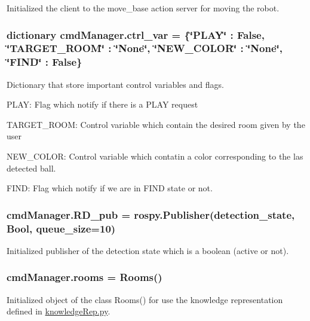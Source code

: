 Initialized the client to the move\+\_\+base action server for moving the robot. 

\subsubsection[{\texorpdfstring{ctrl\+\_\+var}{ctrl_var}}]{\setlength{\rightskip}{0pt plus 5cm}dictionary cmd\+Manager.\+ctrl\+\_\+var = \{\char`\"{}P\+L\+AY\char`\"{} \+: False, \char`\"{}T\+A\+R\+G\+E\+T\+\_\+\+R\+O\+OM\char`\"{} \+: \char`\"{}None\char`\"{}, \char`\"{}N\+E\+W\+\_\+\+C\+O\+L\+OR\char`\"{} \+: \char`\"{}None\char`\"{}, \char`\"{}F\+I\+ND\char`\"{} \+: False\}}\hypertarget{namespacecmdManager_a927e4211865b745599afe42e9e8d7c8e}{}\label{namespacecmdManager_a927e4211865b745599afe42e9e8d7c8e}


Dictionary that store important control variables and flags. 


\begin{DoxyItemize}
\item P\+L\+AY\+: Flag which notify if there is a P\+L\+AY request
\item T\+A\+R\+G\+E\+T\+\_\+\+R\+O\+OM\+: Control variable which contain the desired room given by the user
\item N\+E\+W\+\_\+\+C\+O\+L\+OR\+: Control variable which contatin a color corresponding to the las detected ball.
\item F\+I\+ND\+: Flag which notify if we are in F\+I\+ND state or not. 
\end{DoxyItemize}
\subsubsection[{\texorpdfstring{R\+D\+\_\+pub}{RD_pub}}]{\setlength{\rightskip}{0pt plus 5cm}cmd\+Manager.\+R\+D\+\_\+pub = rospy.\+Publisher(\textquotesingle{}detection\+\_\+state\textquotesingle{}, Bool, queue\+\_\+size=10)}\hypertarget{namespacecmdManager_a5f10b08efaeaad88cf34e075895f4d9d}{}\label{namespacecmdManager_a5f10b08efaeaad88cf34e075895f4d9d}


Initialized publisher of the detection state which is a boolean (active or not). 

\subsubsection[{\texorpdfstring{rooms}{rooms}}]{\setlength{\rightskip}{0pt plus 5cm}cmd\+Manager.\+rooms = {\bf Rooms}()}\hypertarget{namespacecmdManager_a783b0ef84682af39dc9f2b8e828c4ad9}{}\label{namespacecmdManager_a783b0ef84682af39dc9f2b8e828c4ad9}


Initialized object of the class Rooms() for use the knowledge representation defined in \hyperlink{knowledgeRep_8py}{knowledge\+Rep.\+py}. 

